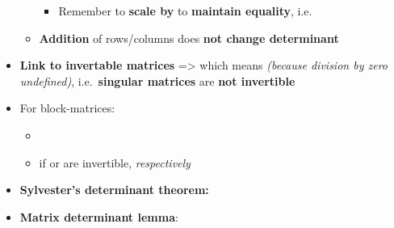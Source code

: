 \begin{itemize}
\begin{itemize}
                \begin{itemize}

                  \item
                        Remember to \textbf{scale by } to
                        \textbf{maintain equality},
                        i.e.~
                \end{itemize}
          \item
                \textbf{Addition} of rows/columns does \textbf{not change
                  determinant}
        \end{itemize}
  \item
        \textbf{Link to invertable matrices} =>
         which means
         \emph{(because
          division by zero undefined)}, i.e.~\textbf{singular matrices} are
        \textbf{not invertible}
  \item
        For block-matrices:

        \begin{itemize}

          \item
          \item
                if  or  are invertible, \emph{respectively}
        \end{itemize}
  \item
        \textbf{Sylvester's determinant theorem:}
  \item
        \textbf{Matrix determinant lemma}:

        \begin{itemize}


\end{itemize}
\end{itemize}
